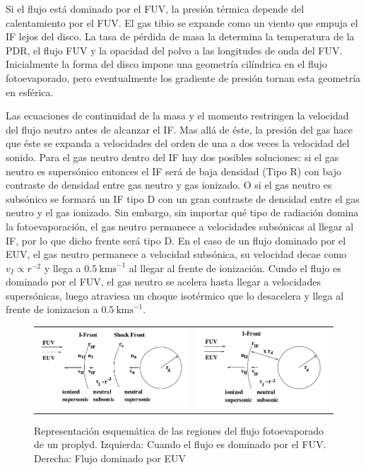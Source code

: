 Si el flujo está dominado por el FUV, la presión térmica depende del calentamiento por el FUV. El gas tibio se expande como un viento que empuja
el IF lejos del disco. La tasa de pérdida de masa la determina la temperatura de la PDR, el flujo FUV y la opacidad del polvo a las longitudes de onda del FUV.
Inicialmente la forma del disco impone una geometría cilíndrica en el flujo fotoevaporado, pero eventualmente los gradiente de presión tornan esta geometría en esférica.

Las ecuaciones de continuidad de la masa y el momento restringen la velocidad del flujo neutro antes de alcanzar el IF. Mas allá de éste, la presión del gas hace que éste se expanda a velocidades del orden de una a dos veces la velocidad del sonido. Para el gas neutro dentro del IF hay dos posibles soluciones: si el gas neutro es supersónico entonces el IF será de baja densidad (Tipo R) con bajo contraste de densidad entre gas neutro y gas ionizado. O si el gas neutro es subsónico se formará un IF tipo D con un gran contraste de densidad entre el gas neutro y el gas ionizado. Sin embargo, sin importar qué tipo de radiación domina la fotoevaporación, el gas neutro permanece a velocidades subsónicas al llegar al IF, por lo que dicho frente será tipo D. En el caso de un flujo dominado por el EUV, el gas neutro permanece a velocidad subsónica, su velocidad decae como $v_I \propto r^{-2}$ y llega a $0.5~\mathrm{kms}^{-1}$ al llegar al frente de ionización. Cundo el flujo es dominado por el FUV, el gas neutro se acelera hasta llegar a velocidades supersónicas, luego atraviesa un choque isotérmico que lo desacelera y llega al frente de ionizacion a $0.5~\mathrm{kms}^{-1}$.

  \begin{figure}
    \begin{tabular}{cc}
      \includegraphics[width=0.5\linewidth]{./Figures/Johnstone-2} &
      \includegraphics[width=0.5\linewidth]{./Figures/Johnstone-3}
    \end{tabular}
    \label{fig:EUV-FUV-IF}
    \caption{Representación esquemática de las regiones del flujo fotoevaporado de un proplyd. Izquierda: Cuando el flujo es dominado por el FUV. Derecha: Flujo dominado por EUV \citep{Johnstone:1998}}
  \end{figure}
  

